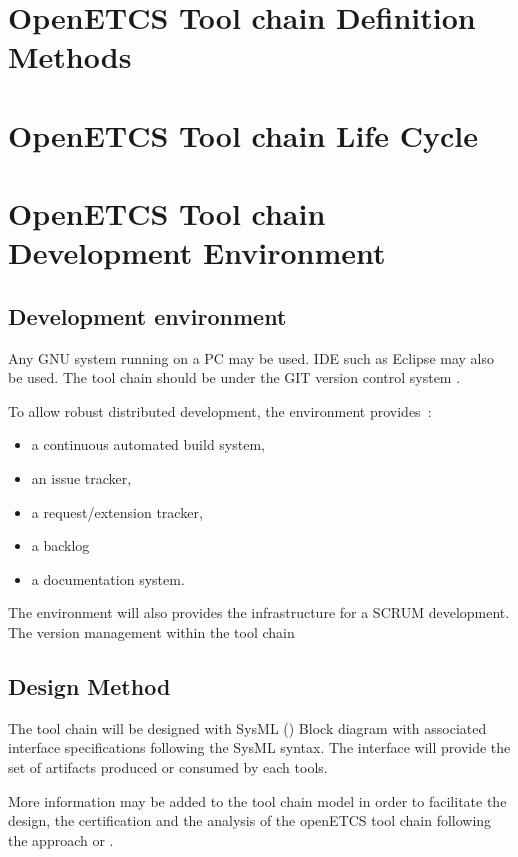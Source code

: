 \documentclass{openetcs_article}
\begin{document}
\section{OpenETCS Tool chain Definition Methods}
\label{sec:toolchaindef}



\section{OpenETCS Tool chain Life Cycle}
\label{sec:lifecycle}


\section{OpenETCS Tool chain Development Environment}
\label{sec:env}
\subsection{Development environment}
Any GNU system running on a PC may be used. \gls{IDE}  such as Eclipse may
also be used. 
The tool chain should be under the GIT  version control system
\cite{Chacon:2009}.


To allow robust distributed development, the  environment provides~:
\begin{itemize}
\item  a continuous automated build system,
\item an issue tracker,
\item a request/extension tracker,
\item a backlog
\item a  documentation system.

\end{itemize}
The environment will also provides the infrastructure for a SCRUM development.
The version management within the tool chain 

\subsection{Design Method}
The tool chain will be designed with SysML (\cite{SysML}) Block
diagram with associated interface specifications following the SysML syntax.
The interface will provide the set of artifacts produced or consumed by each tools.

More information may be added to the tool chain model in
order to facilitate the design, the certification and the analysis  of
the openETCS tool chain following the approach
\cite{slotosch_model-based_2012} or \cite{asplund_towards_2012}.
\end{document}
